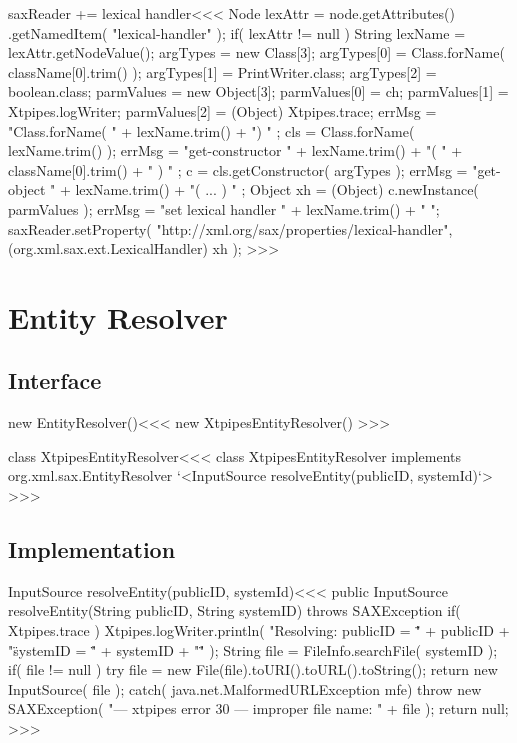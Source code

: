 \documentclass{article}
\begin{document}
\<saxReader += lexical handler\><<<
Node lexAttr = node.getAttributes()
                  .getNamedItem( "lexical-handler" );
if( lexAttr != null ){
   String lexName = lexAttr.getNodeValue();
   argTypes = new Class[3];
   argTypes[0] = Class.forName( className[0].trim() );
   argTypes[1] = PrintWriter.class;
   argTypes[2] = boolean.class;
   parmValues = new Object[3];
   parmValues[0] = ch;
   parmValues[1] = Xtpipes.logWriter;
   parmValues[2] = (Object) Xtpipes.trace;
   errMsg = "Class.forName( " + lexName.trim() + ") " ;
   cls = Class.forName( lexName.trim() );
   errMsg = "get-constructor " +
                lexName.trim() +
                "( " + className[0].trim() + " ) " ;
   c = cls.getConstructor( argTypes );
   errMsg = "get-object " +
               lexName.trim() + "( ... ) " ;
   Object xh = (Object) c.newInstance( parmValues );
   errMsg = "set lexical handler " + lexName.trim() + " ";
   saxReader.setProperty(
       "http://xml.org/sax/properties/lexical-handler",
       (org.xml.sax.ext.LexicalHandler) xh
    );
}
>>>










\section{Entity Resolver}


\subsection{Interface}




\<new EntityResolver()\><<<
new XtpipesEntityResolver()
>>>

\<class XtpipesEntityResolver\><<<
class XtpipesEntityResolver implements  org.xml.sax.EntityResolver {
   `<InputSource resolveEntity(publicID, systemId)`>
}
>>>


\subsection{Implementation}



\<InputSource resolveEntity(publicID, systemId)\><<<
public InputSource resolveEntity(String publicID, String systemID)
                                                    throws SAXException {
   if( Xtpipes.trace ){
      Xtpipes.logWriter.println( "Resolving: publicID = \" " + publicID
                + "\"  systemID = \"" + systemID + "\"" );
   }
   String file = FileInfo.searchFile( systemID );
   if( file != null ){
     try{
        file = new File(file).toURI().toURL().toString();
        return new InputSource( file );
     } catch( java.net.MalformedURLException mfe){
        throw new SAXException(
          "--- xtpipes error 30 --- improper file name: " + file  );
   } }
   return null;
}
>>>
\end{document}
